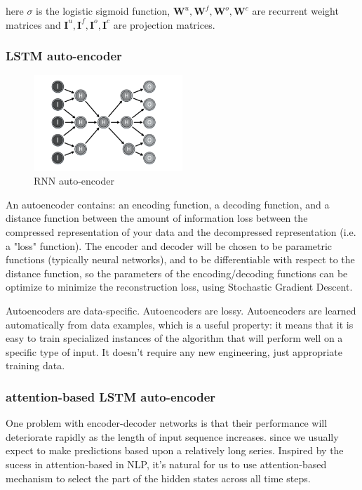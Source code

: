 \documentclass[5p]{elsarticle}
\begin{document}
here $\sigma$ is the logistic sigmoid function, $\mathbf W^u, \mathbf W^f, \mathbf W^o, \mathbf W^c$ are recurrent weight matrices and $\mathbf I^u, \mathbf I^f, \mathbf I^o, \mathbf I^c$ are projection matrices.


\subsubsection{LSTM auto-encoder}
\cite{ChoLearningTranslation}
\begin{figure}[h]
    \centering
    \includegraphics[width=0.5\textwidth]{auto_encoder.png}
    \caption{RNN auto-encoder}
    \label{fig:RNN_encoder-decoder}
\end{figure}

An autoencoder contains: an encoding function, a decoding function, and a distance function between the amount of information loss between the compressed representation of your data and the decompressed representation (i.e. a "loss" function). The encoder and decoder will be chosen to be parametric functions (typically neural networks), and to be differentiable with respect to the distance function, so the parameters of the encoding/decoding functions can be optimize to minimize the reconstruction loss, using Stochastic Gradient Descent. 

Autoencoders are data-specific. Autoencoders are lossy. Autoencoders are learned automatically from data examples, which is a useful property: it means that it is easy to train specialized instances of the algorithm that will perform well on a specific type of input. It doesn't require any new engineering, just appropriate training data. \cite{BuildingKeras}

\subsubsection{attention-based LSTM auto-encoder}
One problem with encoder-decoder networks is that their performance will deteriorate rapidly as the length of input sequence increases. since we usually expect to make predictions based upon a relatively long series. Inspired by the sucess in attention-based in NLP, it's natural for us to use attention-based mechanism to select the part of the hidden states across all time steps.
\end{document}
